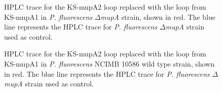 		\setlength\fboxsep{5pt}
		\setlength\fboxrule{1.5pt}
		\begin{figure}[htbp]
		\centering
		\caption[HPLC trace for the KS-mupA2 loop replaced with the loop from KS-mupA1 in \textit{P. fluorescens} $ \Delta $\textit{mupA} strain.]{HPLC trace for the KS-mupA2 loop replaced with the loop from KS-mupA1 in \textit{P. fluorescens} $ \Delta $\textit{mupA} strain, shown in red. The blue line represents the HPLC trace for \textit{P. fluorescens} $ \Delta $\textit{mupA} strain used as control.}
		\label{fig:ks1DeltaMupa}
		\end{figure}						

		\setlength\fboxsep{5pt}
		\setlength\fboxrule{1.5pt}
		\begin{figure}[htbp]
		\centering
		\caption[HPLC trace for the KS-mupA2 loop replaced with the loop from KS-mupA1 in \textit{P. fluorescens} NCIMB 10586 wild type strain.]{HPLC trace for the KS-mupA2 loop replaced with the loop from KS-mupA1 in \textit{P. fluorescens} NCIMB 10586 wild type strain, shown in red. The blue line represents the HPLC trace for \textit{P. fluorescens} $ \Delta $\textit{mupA} strain used as control. }
		\label{fig:ks1WildType}
		\end{figure}				

